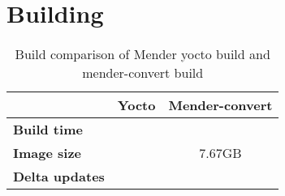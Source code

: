 \documentclass[../../main.tex]{subfiles}
\begin{document}
\section{Building}%
\label{sec:building}

\begin{table}[h]
	\centering
	\caption{Build comparison of Mender yocto build and mender-convert build}
	\label{tab:build_comp}
	\begin{tabular}{l|cc}
		& \textbf{Yocto} & \textbf{Mender-convert}\\
		\hline
		\textbf{Build time}&&\\
		\textbf{Image size}&&7.67GB\\
		\textbf{Delta updates}&&
	\end{tabular}
\end{table}
\end{document}
